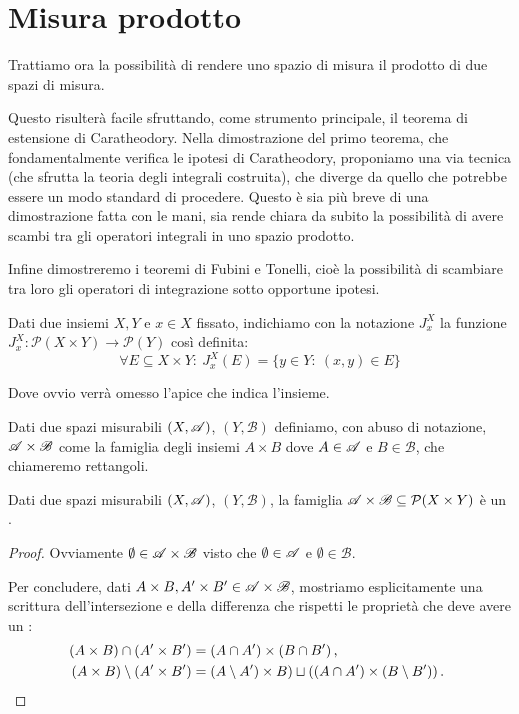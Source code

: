 \section{Misura prodotto}
Trattiamo ora la possibilità di rendere uno spazio di misura il prodotto di due spazi di misura. 

Questo risulterà facile sfruttando, come strumento principale, il teorema di estensione di Caratheodory. 
Nella dimostrazione del primo teorema, che fondamentalmente verifica le ipotesi di Caratheodory, proponiamo una via tecnica (che sfrutta la teoria degli integrali costruita), che diverge da quello che potrebbe essere un modo standard di procedere. Questo è sia più breve di una dimostrazione fatta con le mani, sia rende chiara da subito la possibilità di avere scambi tra gli operatori integrali in uno spazio prodotto. 

Infine dimostreremo i teoremi di Fubini e Tonelli, cioè la possibilità di scambiare tra loro gli operatori di integrazione sotto opportune ipotesi.


\newcommand{\B}{\ensuremath{\mathscr B}}
\begin{definition}
	Dati due insiemi $X,Y$ e $x\in X$ fissato, indichiamo con la notazione $J^X_x$ la funzione $J^X_x:\mathcal P(X\times Y) \to \mathcal P(Y)$ così definita:
	\begin{equation*}
		\forall E\subseteq X\times Y:\ J^X_x(E)=\{y\in Y:\ (x,y)\in E\}
	\end{equation*}
	
	Dove ovvio verrà omesso l'apice che indica l'insieme.
\end{definition}

\begin{definition}\label{def:SemianelloProdotto}
	Dati due spazi misurabili $(X,\mathscr A)$, $(Y,\B)$ definiamo, con abuso di notazione, $\A\times\B$ come la famiglia degli insiemi $A\times B$ dove $A\in\mathscr A$ e $B\in\B$, che chiameremo rettangoli.
\end{definition}

\begin{proposition}\label{prop:SemianelloProdotto}
	Dati due spazi misurabili $(X,\mathscr A)$, $(Y,\B)$, la famiglia $\A\times\B\subseteq \mathcal P(X\times Y)$ è un \semiring{}.
\end{proposition}
\begin{proof}
	Ovviamente $\emptyset\in\A\times\B$ visto che $\emptyset\in\mathscr A$ e $\emptyset\in\B$.
	
	Per concludere, dati $A\times B, A'\times B'\in\A\times\B$, mostriamo esplicitamente una scrittura dell'intersezione e della differenza che rispetti le proprietà che deve avere un \semiring{}:
	\begin{align*}
		(A\times B)\cap (A'\times B') &= (A\cap A')\times(B\cap B')\, \text{, } \\
		(A\times B)\setminus (A'\times B') &= (A\setminus A')\times B)\sqcup( (A\cap A')\times (B\setminus B') )\, \text{. }
	\end{align*}
\end{proof}

